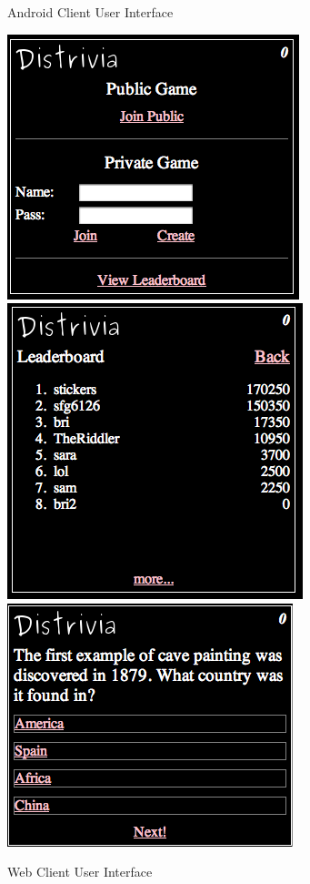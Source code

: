 \documentclass{dependencies/acm_proc_article-sp}
\begin{document}
\begin{figure}[h!]
   \caption{Android Client User Interface}
\end{figure}

\begin{figure}[h!]
   \includegraphics[scale=0.24]{web_join.png}
   \includegraphics[scale=0.24]{web_leader.png}
   \includegraphics[scale=0.24]{web_round.png}
   \caption{Web Client User Interface}
\end{figure}
\end{document}
